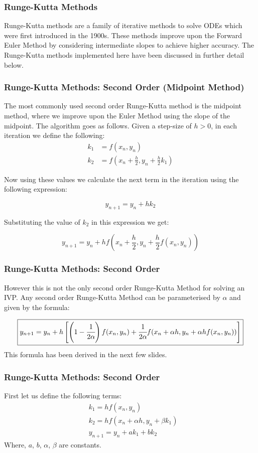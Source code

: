 \documentclass{beamer}
\begin{document}
\begin{frame}
    \frametitle{Runge-Kutta Methods}
Runge-Kutta methods are a family of iterative methods to solve ODEs which were first introduced in the 1900s. These methods improve upon the Forward Euler Method by considering intermediate slopes to achieve higher accuracy. The Runge-Kutta methods implemented here have been discussed in further detail below.
\end{frame}
\begin{frame}
    \frametitle{Runge-Kutta Methods: Second Order (Midpoint Method)}

    The most commonly used second order Runge-Kutta method is the midpoint method, where we improve upon the Euler Method using the slope of the midpoint. The algorithm goes as follows. Given a step-size of $h > 0$, in each iteration we define the following:
    \begin{align*}
        k_1 &= f(x_n , y_n) \\
        k_2 &= f\left(x_n + \frac{h}{2}, y_n + \frac{h}{2}k_1\right)
    \end{align*}

Now using these values we calculate the next term in the iteration using the following expression:

$$y_{n + 1} = y_n + hk_2$$

Substituting the value of $k_2$ in this expression we get:

$$\boxed{y_{n + 1} = y_n + hf\left(x_n + \frac{h}{2}, y_n + \frac{h}{2}f(x_n , y_n)\right)}$$
\end{frame}
\begin{frame}
    \frametitle{Runge-Kutta Methods: Second Order}
    However this is not the only second order Runge-Kutta Method for solving an IVP. Any second order 
Runge-Kutta Method can be parameterised by $\alpha$ and given by the formula:

$$\boxed{y_{n+1} = y_n + h\left[\left(1 - \cfrac{1}{2\alpha}\right)f(x_n, y_n) + \cfrac{1}{2\alpha}f(x_n + \alpha h, y_n + \alpha hf(x_n, y_n))\right]}$$
    This formula has been derived in the next few slides.
\end{frame}
\begin{frame}
    \frametitle{Runge-Kutta Methods: Second Order}
    First let us define the following terms:
    \begin{align*}
        &k_1 = hf(x_n, y_n) \\
        &k_2 = hf(x_n + \alpha h, y_n + \beta k_1) \\
        &y_{n+1} = y_n + ak_1 + bk_2 \tag{1}
    \end{align*}
    Where, $a$, $b$, $\alpha$, $\beta$ are constants.
    
\end{frame}
\end{document}
